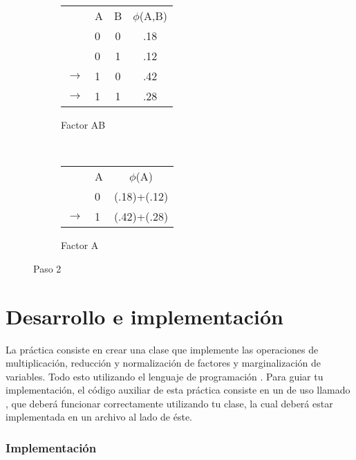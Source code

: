 \begin{figure}[H]
    \centering
    \begin{subfigure}[b]{0.4\textwidth}
        \centering
        \begin{tabular}{ l l  c | c }
           & A & B & $\phi$(A,B)\\ \cline{2-4}
           & 0 & 0 & .18  \\ \cline{2-4}
           & 0 & 1 & .12  \\ \cline{2-4}
          \(\to\) & 1 & 0 & .42  \\ \cline{2-4}
          \(\to\) & 1 & 1 & .28  \\
        \end{tabular}
        \caption{Factor AB}
    \end{subfigure}
    ~ 
    \begin{subfigure}[b]{0.4\textwidth}
        \centering
        \begin{tabular}{l  l | c }
            & A & $\phi$(A)\\ \cline{2-3}
            & 0 & (.18)+(.12)  \\ \cline{2-3}
        \(\to\) & 1 & (.42)+(.28)  \\
        \end{tabular}
        \caption{Factor A}
    \end{subfigure}
    \caption{Paso 2}\label{fig:MargB}
\end{figure}


\section{Desarrollo e implementaci\'on}

\noindent La práctica consiste en crear una clase  que implemente las operaciones de multiplicación, reducción y normalización de factores y marginalización de variables. Todo esto utilizando el lenguaje de programación .  Para guiar tu implementación, el código auxiliar de esta práctica consiste en un  de uso llamado , que deberá funcionar correctamente utilizando tu clase, la cual deberá estar implementada en un archivo  al lado de éste.


\subsubsection{Implementaci\'on}

